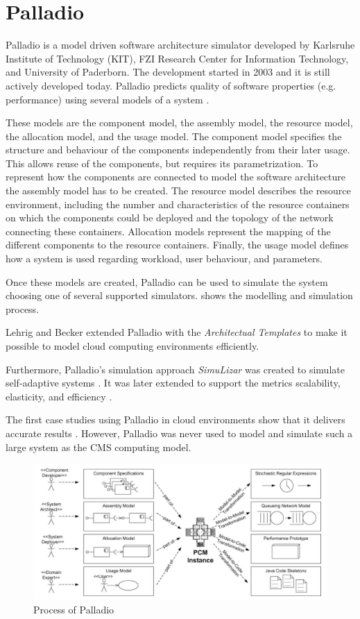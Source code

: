\section{Palladio}
\label{palladio}
Palladio is a model driven software architecture simulator developed by Karlsruhe Institute of Technology (KIT), FZI Research Center for Information Technology, and University of Paderborn. The development started in 2003 and it is still actively developed today. Palladio predicts quality of software properties (e.g. performance) using several models of a system \cite{BECKER20093}.

These models are the component model, the assembly model, the resource model, the allocation model, and the usage model.
The component model specifies the structure and behaviour of the components independently from their later usage. This allows reuse of the components,  but requires its parametrization.
To represent how the components are connected to model the software architecture the assembly model has to be created. 
The resource model describes the resource environment, including the number and characteristics of the resource containers on which the components could be deployed and the topology of the network connecting these containers.
Allocation models represent the mapping of the different components to the resource containers.
Finally, the usage model defines how a system is used regarding workload, user behaviour, and parameters.

Once these models are created, Palladio can be used to simulate the system choosing one of several supported simulators.  shows the modelling and simulation process. 

Lehrig and Becker \cite{arch} extended Palladio with the \textit{Architectual Templates} to make it possible to model cloud computing environments efficiently.

Furthermore, Palladio's simulation approach \textit{SimuLizar} was created to simulate self-adaptive systems \cite{becker2013simulizar}.
It was later extended to support the metrics scalability, elasticity, and efficiency \cite{arch}.

The first case studies using Palladio in cloud environments show that it delivers accurate results \cite{arch}. However, Palladio was never used to model and simulate such a large system as the CMS computing model.

\begin{figure}
	\centering
	\includegraphics[width=0.95\linewidth]{images/palladio}
	\caption[]{Process of Palladio \cite{BECKER20093}}
	\label{fig:palladio}
\end{figure}



